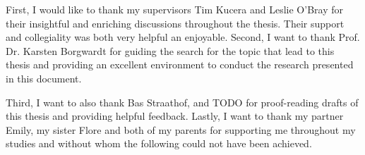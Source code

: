 First, I would like to thank my supervisors Tim Kucera and Leslie O'Bray for
their insightful and enriching discussions throughout the thesis. Their support
and collegiality was both very helpful an enjoyable. Second, I want to thank
Prof. Dr. Karsten Borgwardt for guiding the search for the topic that lead to
this thesis and providing an excellent environment to conduct the research
presented in this document.

Third, I want to also thank Bas Straathof, and TODO for proof-reading drafts of this
thesis and providing helpful feedback. Lastly, I want to thank my partner Emily,
my sister Flore and both of my parents for supporting me throughout my studies and
without whom the following could not have been achieved.
